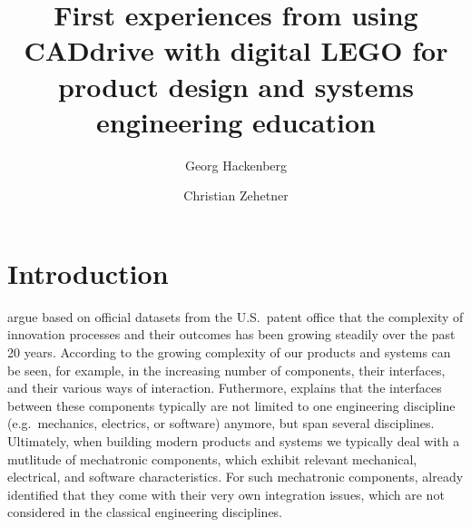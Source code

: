 \documentclass{PDS}
\begin{document}

\title[FIRST EXPERIENCES FROM USING CADDRIVE WITH DIGITAL LEGO]{First experiences from using CADdrive with digital LEGO for product design and systems engineering education}

\author[1]{Georg Hackenberg}
\author[1]{Christian Zehetner}


\address[1]{School of Engineering, University of Applied Sciences Upper Austria, Wels, Austria}




\maketitle

\section{Introduction}
\label{sec:introduction}

\citet{Luo_2017} argue based on official datasets from the U.S.\ patent office that the complexity of innovation processes and their outcomes has been growing steadily over the past 20 years.
According to \citet{Trattner_2019} the growing complexity of our products and systems can be seen, for example, in the increasing number of components, their interfaces, and their various ways of interaction.
Futhermore, \citet{Thramboulidis_2008} explains that the interfaces between these components typically are not limited to one engineering discipline (e.g.\ mechanics, electrics, or software) anymore, but span several disciplines.
Ultimately, when building modern products and systems we typically deal with a mutlitude of mechatronic components, which exhibit relevant mechanical, electrical, and software characteristics.
For such mechatronic components, \citet{Youcef_Toumi_1996} already identified that they come with their very own integration issues, which are not considered in the classical engineering disciplines.
\end{document}
